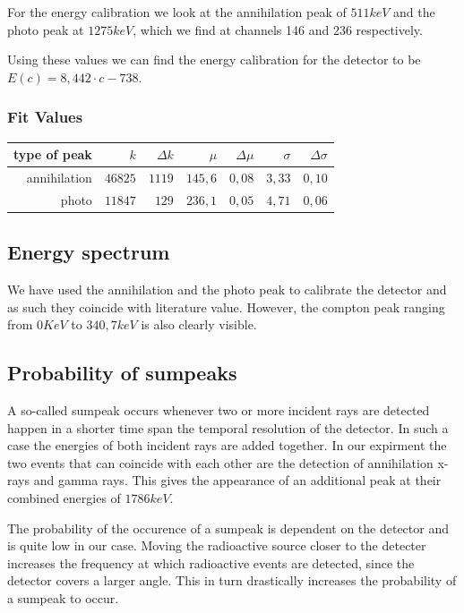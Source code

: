 \documentclass[bigchapter,colorback,accentcolor=tud4b,linedtoc,11pt]{tudreport}
\begin{document}
For the energy calibration we look at the annihilation peak of $511 keV$ and the
photo peak at $1275 keV$, which we find at channels 146 and 236 respectively.

Using these values we can find the energy calibration for the detector to be $E(c) = 8,442 \cdot c - 738$.

\subsubsection{Fit Values}
\begin{center}
  \begin{tabular}{r|r|r|r|r|r|r}
     type of peak & $k$     & $\Delta k$ & $\mu$   & $\Delta \mu$ & $\sigma$ & $\Delta \sigma$ \\ \hline
     annihilation & $46825$ & $1119$     & $145,6$ & $0,08$       & $3,33$   & $0,10$          \\ \hline
     photo        & $11847$ & $129$      & $236,1$ & $0,05$       & $4,71$   & $0,06$          \\
	\end{tabular}
\end{center}


\subsection{Energy spectrum}
We have used the annihilation and the photo peak to calibrate the detector and
as such they coincide with literature value. However, the compton peak ranging
from $0 KeV$ to $340,7 keV$ is also clearly visible.




\subsection{Probability of sumpeaks}
A so-called sumpeak occurs whenever two or more incident rays are detected happen in a
shorter time span the temporal resolution of the detector. In such a case the
energies of both incident rays are added together. In our expirment the two
events that can coincide with each other are the detection of annihilation
x-rays and gamma rays. This gives the appearance of an additional peak at their
combined energies of $1786 keV$.

The probability of the occurence of a sumpeak is dependent on the detector and
is quite low in our case. Moving the radioactive source closer to the detecter
increases the frequency at which radioactive events are detected, since the
detector covers a larger angle. This in turn drastically increases the
probability of a sumpeak to occur.
\end{document}
